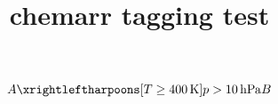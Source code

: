 \documentclass{article}
\title{chemarr tagging test}
\begin{document}
\[
  A
  \xrightleftharpoons[T \geq 400\,\mathrm{K}]{p > 10\,\mathrm{hPa}}
  B
\]
\end{document}
